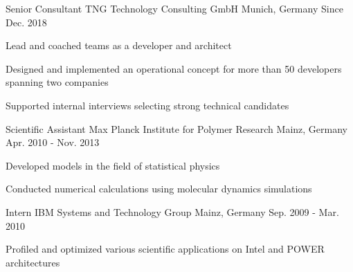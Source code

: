 

\begin{cventries}

  \cventry
    {Senior Consultant}
    {TNG Technology Consulting GmbH}
    {Munich, Germany}
    {Since Dec. 2018}
    {
      \begin{cvitems}
        \item{Lead and coached teams as a developer and architect}
        \item{Designed and implemented an operational concept for more than 50 developers spanning two companies}
        \item{Supported internal interviews selecting strong technical candidates}
      \end{cvitems}
    }

  \cventry
    {Scientific Assistant}
    {Max Planck Institute for Polymer Research}
    {Mainz, Germany}
    {Apr. 2010 - Nov. 2013}
    {
      \begin{cvitems}
        \item {Developed models in the field of statistical physics}
        \item {Conducted numerical calculations using molecular dynamics simulations}
      \end{cvitems}
    }


  \cventry
    {Intern}
    {IBM Systems and Technology Group}
    {Mainz, Germany}
    {Sep. 2009 - Mar. 2010}
    {
      \begin{cvitems}
        \item {Profiled and optimized various scientific applications on Intel and POWER architectures}
      \end{cvitems}
    }

\end{cventries}
